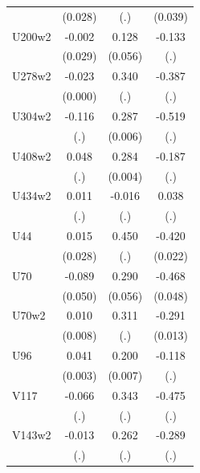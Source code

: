 \begin{table}[htbp]
\begin{tabular}{l*{3}{c}}
                &  (0.028)         &      (.)         &  (0.039)         \\
U200w2          &   -0.002         &    0.128\sym{**} &   -0.133         \\
                &  (0.029)         &  (0.056)         &      (.)         \\
U278w2          &   -0.023\sym{***}&    0.340         &   -0.387         \\
                &  (0.000)         &      (.)         &      (.)         \\
U304w2          &   -0.116         &    0.287\sym{***}&   -0.519         \\
                &      (.)         &  (0.006)         &      (.)         \\
U408w2          &    0.048         &    0.284\sym{***}&   -0.187         \\
                &      (.)         &  (0.004)         &      (.)         \\
U434w2          &    0.011         &   -0.016         &    0.038         \\
                &      (.)         &      (.)         &      (.)         \\
U44             &    0.015         &    0.450         &   -0.420\sym{***}\\
                &  (0.028)         &      (.)         &  (0.022)         \\
U70             &   -0.089\sym{*}  &    0.290\sym{***}&   -0.468\sym{***}\\
                &  (0.050)         &  (0.056)         &  (0.048)         \\
U70w2           &    0.010         &    0.311         &   -0.291\sym{***}\\
                &  (0.008)         &      (.)         &  (0.013)         \\
U96             &    0.041\sym{***}&    0.200\sym{***}&   -0.118         \\
                &  (0.003)         &  (0.007)         &      (.)         \\
V117            &   -0.066         &    0.343         &   -0.475         \\
                &      (.)         &      (.)         &      (.)         \\
V143w2          &   -0.013         &    0.262         &   -0.289         \\
                &      (.)         &      (.)         &      (.)         \\

\end{tabular}
\end{table}
